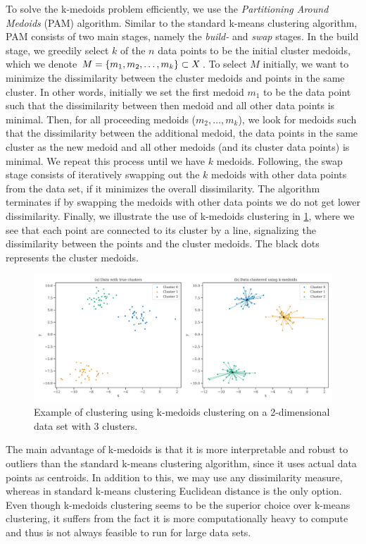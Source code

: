 To solve the k-medoids problem efficiently, we use the \textit{Partitioning Around Medoids} (PAM) algorithm. Similar to the standard k-means clustering algorithm, PAM consists of two main stages, namely the \textit{build-} and \textit{swap} stages. In the build stage, we greedily select $k$ of the $n$ data points to be the initial cluster medoids, which we denote $M = \left\{m_1, m_2, \ldots, m_k\right\} \subset X$. To select $M$ initially, we want to minimize the dissimilarity between the cluster medoids and points in the same cluster. In other words, initially we set the first medoid $m_1$ to be the data point such that the dissimilarity between then medoid and all other data points is minimal. Then, for all proceeding medoids ($m_2, \ldots, m_k$), we look for medoids such that the dissimilarity between the additional medoid, the data points in the same cluster as the new medoid and all other medoids (and its cluster data points) is minimal. We repeat this process until we have $k$ medoids. Following, the swap stage consists of iteratively swapping out the $k$ medoids with other data points from the data set, if it minimizes the overall dissimilarity. The algorithm terminates if by swapping the medoids with other data points we do not get lower dissimilarity. Finally, we illustrate the use of k-medoids clustering in \cref{fig:k-medoids-clustering-2d-example}, where we see that each point are connected to its cluster by a line, signalizing the dissimilarity between the points and the cluster medoids. The black dots represents the cluster medoids.
\begin{figure}[H]
    \centering
    \includegraphics[width=\textwidth]{thesis/figures/k-medoids-clustering-2d-example.pdf}
    \caption{Example of clustering using k-medoids clustering on a 2-dimensional data set with 3 clusters.}
    \label{fig:k-medoids-clustering-2d-example}
\end{figure}

The main advantage of k-medoids is that it is more interpretable and robust to outliers than the standard k-means clustering algorithm, since it uses actual data points as centroids. In addition to this, we may use any dissimilarity measure, whereas in standard k-means clustering Euclidean distance is the only option. Even though k-medoids clustering seems to be the superior choice over k-means clustering, it suffers from the fact it is more computationally heavy to compute and thus is not always feasible to run for large data sets.

